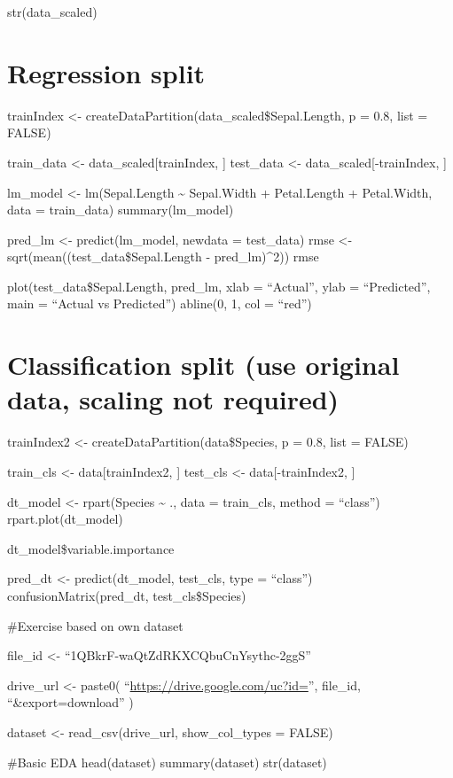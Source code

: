 \documentclass[
]{article}
\begin{document}
str(data\_scaled)

\section{Regression split}\label{regression-split}

trainIndex \textless- createDataPartition(data\_scaled\$Sepal.Length, p
= 0.8, list = FALSE)

train\_data \textless- data\_scaled{[}trainIndex, {]} test\_data
\textless- data\_scaled{[}-trainIndex, {]}

lm\_model \textless- lm(Sepal.Length \textasciitilde{} Sepal.Width +
Petal.Length + Petal.Width, data = train\_data) summary(lm\_model)

pred\_lm \textless- predict(lm\_model, newdata = test\_data) rmse
\textless- sqrt(mean((test\_data\$Sepal.Length - pred\_lm)\^{}2)) rmse

plot(test\_data\$Sepal.Length, pred\_lm, xlab = ``Actual'', ylab =
``Predicted'', main = ``Actual vs Predicted'') abline(0, 1, col =
``red'')

\section{Classification split (use original data, scaling not
required)}\label{classification-split-use-original-data-scaling-not-required}

trainIndex2 \textless- createDataPartition(data\$Species, p = 0.8, list
= FALSE)

train\_cls \textless- data{[}trainIndex2, {]} test\_cls \textless-
data{[}-trainIndex2, {]}

dt\_model \textless- rpart(Species \textasciitilde{} ., data =
train\_cls, method = ``class'') rpart.plot(dt\_model)

dt\_model\$variable.importance

pred\_dt \textless- predict(dt\_model, test\_cls, type = ``class'')
confusionMatrix(pred\_dt, test\_cls\$Species)

\#Exercise based on own dataset

file\_id \textless- ``1QBkrF-waQtZdRKXCQbuCnYsythc-2ggS''

drive\_url \textless- paste0( ``\url{https://drive.google.com/uc?id=}'',
file\_id, ``\&export=download'' )

dataset \textless- read\_csv(drive\_url, show\_col\_types = FALSE)

\#Basic EDA head(dataset) summary(dataset) str(dataset)
\end{document}
